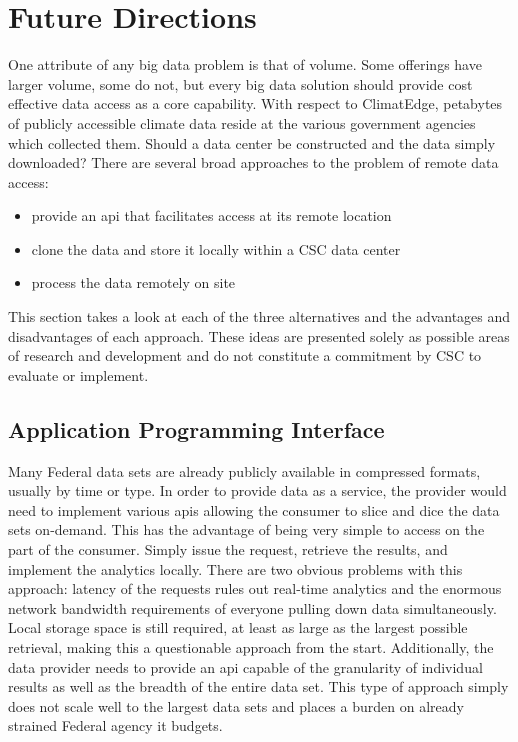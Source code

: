 \section{Future Directions}
One attribute of any big data problem is that of volume. Some offerings have larger volume, some do not, but every big data solution should provide cost effective data access as a core capability. With respect to ClimatEdge, petabytes of publicly accessible climate data reside at the various government agencies which collected them. Should a data center be constructed and the data simply downloaded? There are several broad approaches to the problem of remote data access:
\begin{itemize}
    \item provide an \gls{api} that facilitates access at its remote location
    \item clone the data and store it locally within a \textsc{CSC} data center
    \item process the data remotely on site
\end{itemize}
This section takes a look at each of the three alternatives and the advantages and disadvantages of each approach. These ideas are presented solely as possible areas of research and development and do not constitute a commitment by \textsc{CSC} to evaluate or implement.
\subsection{Application Programming Interface}
Many Federal data sets are already publicly available in compressed formats, usually by time or type. In order to provide data as a service, the provider would need to implement various \gls{api}s allowing the consumer to slice and dice the data sets on-demand. This has the advantage of being very simple to  access on the part of the consumer. Simply issue the request, retrieve the results, and implement the analytics locally. There are two obvious problems with this approach: latency of the requests rules out real-time analytics and the enormous network bandwidth requirements of everyone pulling down data simultaneously. Local storage space is still required, at least as large as the largest possible retrieval, making this a questionable approach from the start. Additionally, the data provider needs to provide an \gls{api} capable of the granularity of individual results as well as the breadth of the entire data set. This type of approach simply does not scale well to the largest data sets and places a burden on already strained Federal agency \gls{it} budgets.
